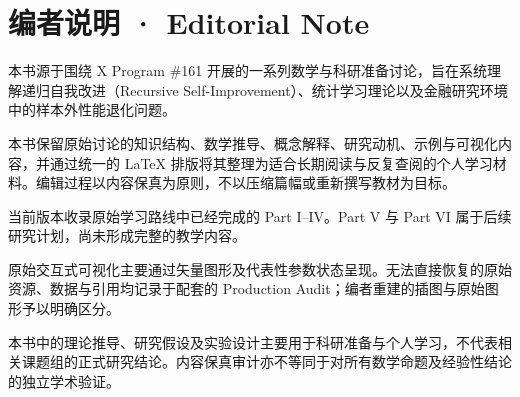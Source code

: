 \section{编者说明 · Editorial Note}

本书源于围绕 X Program \#161 开展的一系列数学与科研准备讨论，旨在系统理解递归自我改进（Recursive Self-Improvement）、统计学习理论以及金融研究环境中的样本外性能退化问题。

本书保留原始讨论的知识结构、数学推导、概念解释、研究动机、示例与可视化内容，并通过统一的 LaTeX 排版将其整理为适合长期阅读与反复查阅的个人学习材料。编辑过程以内容保真为原则，不以压缩篇幅或重新撰写教材为目标。

当前版本收录原始学习路线中已经完成的 Part I–IV。Part V 与 Part VI 属于后续研究计划，尚未形成完整的教学内容。

原始交互式可视化主要通过矢量图形及代表性参数状态呈现。无法直接恢复的原始资源、数据与引用均记录于配套的 Production Audit；编者重建的插图与原始图形予以明确区分。

本书中的理论推导、研究假设及实验设计主要用于科研准备与个人学习，不代表相关课题组的正式研究结论。内容保真审计亦不等同于对所有数学命题及经验性结论的独立学术验证。

